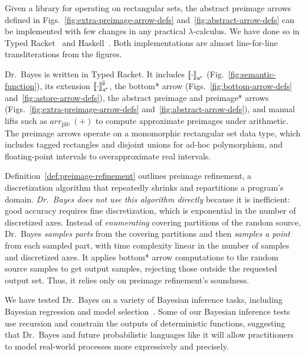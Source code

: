 \documentclass{llncs}
\newcommand{\figref}[1]{Fig.~\ref{#1}}
\newcommand{\figsref}[1]{Figs.~\ref{#1}}
\newcommand{\conv}{^{\mspace{-2mu}\Downarrow\mspace{-2mu}}}
\newcommand{\genc}{_{a^{\mspace{-2mu}*}}}
\newcommand{\prehat}{_\mathrm{\widehat{pre}}}
\begin{document}
Given a library for operating on rectangular sets, the abstract preimage arrows defined in \figsref{fig:extra-preimage-arrow-defs} and~\ref{fig:abstract-arrow-defs} can be implemented with few changes in any practical $\lambda$-calculus.
We have done so in Typed Racket~\cite{cit:tobin-hochstadt-2008popl-typed-scheme} and Haskell~\cite{cit:haskell-lang}.
Both implementations are almost line-for-line transliterations from the figures.

Dr.~Bayes is written in Typed Racket.
It includes $\meaningof{\cdot}\genc$ (\figref{fig:semantic-function}), its extension $\meaningof{\cdot}\genc\conv$, the bottom* arrow (\figsref{fig:bottom-arrow-defs} and~\ref{fig:astore-arrow-defs}), the abstract preimage and preimage* arrows (\figsref{fig:extra-preimage-arrow-defs} and~\ref{fig:abstract-arrow-defs}), and manual lifts such as $arr\prehat~(+)$ to compute approximate preimages under arithmetic.
The preimage arrows operate on a monomorphic rectangular set data type, which includes tagged rectangles and disjoint unions for ad-hoc polymorphism, and floating-point intervals to overapproximate real intervals.

Definition~\ref{def:preimage-refinement} outlines preimage refinement, a discretization algorithm that repeatedly shrinks and repartitions a program's domain.
\emph{Dr.~Bayes does not use this algorithm directly} because it is inefficient: good accuracy requires fine discretization, which is exponential in the number of discretized axes.
Instead of \emph{enumerating} covering partitions of the random source, Dr.~Bayes \emph{samples parts} from the covering partitions and then \emph{samples a point} from each sampled part, with time complexity linear in the number of samples and discretized axes.
It applies bottom* arrow computations to the random source samples to get output samples, rejecting those outside the requested output set.
Thus, it relies only on preimage refinement's soundness.

We have tested Dr.~Bayes on a variety of Bayesian inference tasks, including Bayesian regression and model selection~\cite{cit:toronto-thesis}.
Some of our Bayesian inference tests use recursion and constrain the outputs of deterministic functions, suggesting that Dr.~Bayes and future probabilistic languages like it will allow practitioners to model real-world processes more expressively and precisely.
\end{document}

